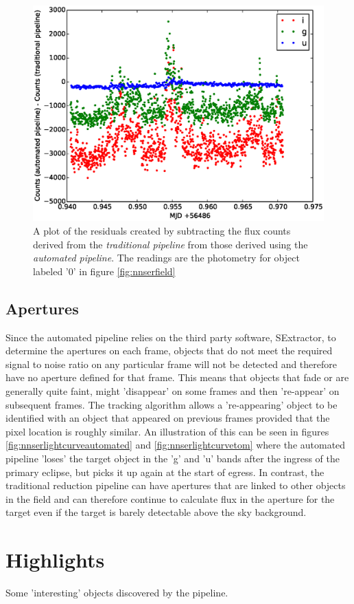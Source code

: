 \begin{figure}[!h]
\centering
\includegraphics[width=140mm]{images/residuals.eps}
\caption{A plot of the residuals created by subtracting the flux counts derived from the \emph{traditional pipeline} from those derived using the \emph{automated pipeline}. The readings are the photometry for object labeled '0' in figure \ref{fig:nnserfield}}
\label{fig:residualplot}
\end{figure}

\subsection{Apertures}
Since the automated pipeline relies on the third party software, SExtractor, to determine the apertures on each frame, objects that do not meet the required signal to noise ratio on any particular frame will not be detected and therefore have no aperture defined for that frame. This means that objects that fade or are generally quite faint, might 'disappear' on some frames and then 're-appear' on subsequent frames. The tracking algorithm allows a 're-appearing' object to be identified with an object that appeared on previous frames provided that the pixel location is roughly similar. An illustration of this can be seen in figures \ref{fig:nnserlightcurveautomated} and \ref{fig:nnserlightcurvetom} where the automated pipeline 'loses' the target object in the 'g' and 'u' bands after the ingress of the primary eclipse, but picks it up again at the start of egress. In contrast, the traditional reduction pipeline can have apertures that are linked to other objects in the field and can therefore continue to calculate flux in the aperture for the target even if the target is barely detectable above the sky background.


\section{Highlights}

Some 'interesting' objects discovered by the pipeline.



